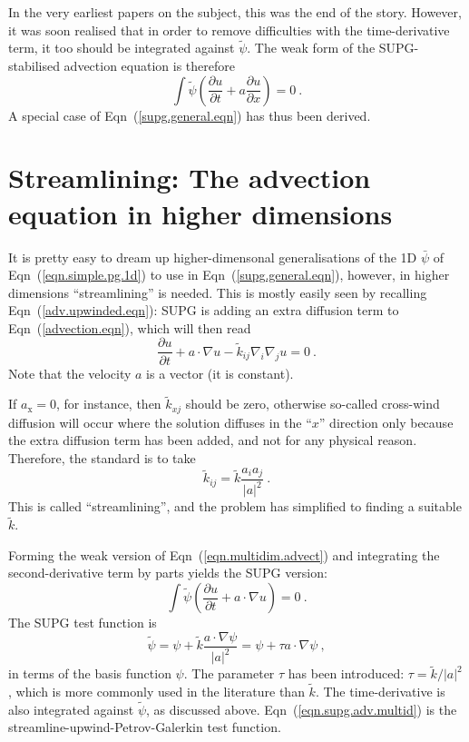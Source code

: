 \documentclass[]{scrreprt}
\begin{document}
In the very earliest papers on the subject, this was the end of the
story.  However, it was soon realised that in order to remove
difficulties with the time-derivative term, it too should be
integrated against $\tilde{\psi}$.  The weak form of the
SUPG-stabilised advection equation is therefore
\begin{equation}
\int \tilde{\psi} \left(\frac{\partial u}{\partial t} +
a\frac{\partial u}{\partial x}\right) = 0\ .
\end{equation}
A special case of Eqn~(\ref{supg.general.eqn}) has thus been derived.


\section{Streamlining: The advection equation in higher dimensions}

It is pretty easy to dream up higher-dimensonal generalisations of the
1D $\bar{\psi}$ of Eqn~(\ref{eqn.simple.pg.1d}) to use in
Eqn~(\ref{supg.general.eqn}), however, in higher dimensions
``streamlining'' is needed.  This is mostly easily seen by recalling
Eqn~(\ref{adv.upwinded.eqn}): SUPG is adding an extra diffusion term
to Eqn~(\ref{advection.eqn}), which will then read
\begin{equation}
\frac{\partial u}{\partial t} + a\cdot\nabla u -
\tilde{k}_{ij}\nabla_{i}\nabla_{j}u = 0 \ .
\label{eqn.multidim.advect}
\end{equation}
Note that the velocity $a$ is a vector (it is constant).

If $a_{\mathrm{x}} = 0$, for instance, then $\tilde{k}_{xj}$ should be
zero, otherwise so-called cross-wind diffusion will occur where the
solution diffuses in the ``$x$'' direction only because the extra
diffusion term has been added, and not for any physical reason.
Therefore, the standard is to take
\begin{equation}
\tilde{k}_{ij} = \tilde{k} \frac{a_{i}a_{j}}{|a|^{2}} \ .
\end{equation}
This is called ``streamlining'', and the problem has simplified to
finding a suitable $\tilde{k}$.

Forming the weak version of Eqn~(\ref{eqn.multidim.advect}) and
integrating the second-derivative term by parts yields the SUPG
version:
\begin{equation}
\int \tilde{\psi} \left( \frac{\partial u}{\partial t} + a\cdot\nabla
u \right) = 0 \ .
\end{equation}
The SUPG test function is
\begin{equation}
\tilde{\psi} = \psi + \tilde{k} \frac{a\cdot \nabla\psi}{|a|^{2}}  =
\psi + \tau a\cdot\nabla\psi\ ,
\label{eqn.supg.adv.multid}
\end{equation}
in terms of the basis function $\psi$.  The parameter $\tau$ has been
introduced: $\tau = \tilde{k}/|a|^{2}$, which is more commonly used in
the literature than $\tilde{k}$.  The time-derivative is also
integrated against $\tilde{\psi}$, as discussed above.
Eqn~(\ref{eqn.supg.adv.multid}) is the
streamline-upwind-Petrov-Galerkin test function.
\end{document}
